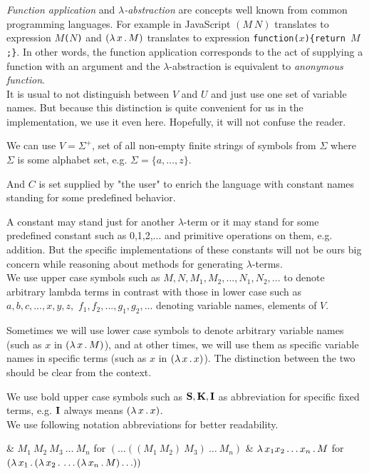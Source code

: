 \documentclass[12pt,a4paper]{report}
\newcommand{\lterm}{$\lambda$-term\xspace}
\newcommand{\lterms}{$\lambda$-terms\xspace}
\newcommand{\setDots}[2]{ 
	\lbrace #1 , \dots , #2 \rbrace
}
\begin{document}
\textit{Function application} and 
\textit{$\lambda$-abstraction} are concepts
well known from common programming languages. 
For example in JavaScript 
$(M~N)$ translates to expression \texttt{$M$($N$)} and
$( \lambda \, x \, . \, M )$ translates to expression \texttt{function($x$)\{return $M$;\}}.
In other words, the function application 
corresponds to the act of supplying a function 
with an argument and
the $\lambda$-abstraction is equivalent to 
\textit{anonymous function}. \\

It is usual to not distinguish between $V$ and $U$ and just use
one set of variable names. But because this distinction is quite convenient
for us in the implementation, we use it even here. 
Hopefully, it will not confuse the reader.
 

We can use $V = \Sigma^+$, set of all non-empty finite strings of symbols 
from $\Sigma$ where $\Sigma$ is some alphabet set, e.g.  
$
\Sigma =
\setDots{a}{z}$.

And $C$ is set supplied by "the user" to enrich 
the language with constant names standing
for some predefined behavior.

A constant may stand just for another \lterm
or it may stand for some predefined constant 
such as 0,1,2,... and primitive operations on
them, e.g. addition. 
But the specific implementations 
of these constants will not be ours big concern 
while reasoning about methods for generating 
\lterms .\\

We use upper case symbols such as 
$M,N,M_1,M_2,...,N_1,N_2,...$
to denote arbitrary lambda terms in contrast with
those in lower case such as
$a,b,c,...,x,y,z,$
$f_1,f_2,...,g_1,g_2,...$
denoting variable names, elements of $V$.

Sometimes we will use lower case symbols
to denote arbitrary variable names (such as
$x$ in $( \lambda \, x \, . \, M )$),
and at other times, we will use them
as specific variable names in specific terms 
(such as $x$ in $( \lambda \, x \, . \, x )$).
The distinction between the two should be
clear from the context.

We use bold upper case symbols such as 
$\mathbf{S}, \mathbf{K}, \mathbf{I}$ as abbreviation
for specific fixed terms, e.g. 
$\mathbf{I}$ always means $( \lambda \, x \, . \, x )$.  
\\[1em]

We use following notation
abbreviations for better readability. \vspace{3mm}

\begin{easylist}[enumerate]
& $M_1~M_2~M_3~\dots~M_n$ for 
  $(\dots((M_1~M_2)~M_3)~\dots~M_n)$ 
& $\lambda \, x_1 x_2 \dots x_n  \, . \, M$ for
  $\lamb{x_1}{\lamb{x_2}{\dots\lamb{x_n}{M}\dots}}$
\end{easylist}~
  
\end{document}
